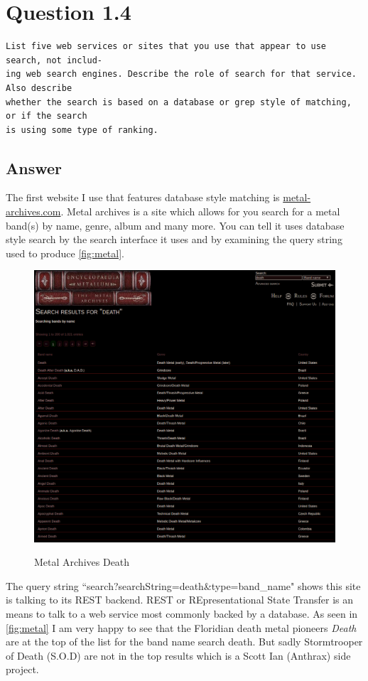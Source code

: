 \documentclass[11pt]{article}
\begin{document}
\section{Question 1.4}
\begin{verbatim}
List five web services or sites that you use that appear to use search, not includ-
ing web search engines. Describe the role of search for that service. Also describe
whether the search is based on a database or grep style of matching, or if the search
is using some type of ranking.
\end{verbatim}
\subsection{Answer}
The first website I use that features database style matching is \hyperref[http://www.metal-archives.com/]{metal-archives.com}. Metal archives is a site which allows for you search for a metal band(s) by name, genre, album and many more. You can tell it uses database style search by the search interface it uses and by examining the query string used to produce \autoref{fig:metal}.
\begin{figure}[h]
	\centering
		{\includegraphics[scale=0.5]{searchStyleMA.png}}  
	\caption{Metal Archives Death} \label{fig:metal}
\end{figure}\newline
The query string ``search?searchString=death\&type=band\_name" shows this site is talking to its REST backend. REST or REpresentational State Transfer is an means to talk to a web service most commonly backed by a database. As seen in \autoref{fig:metal} I am very happy to see that the Floridian death metal pioneers \emph{Death} are at the top of the list for the band name search death. But sadly Stormtrooper of Death (S.O.D) are not in the top results which is a Scott Ian (Anthrax) side project. \newpage
\end{document}
